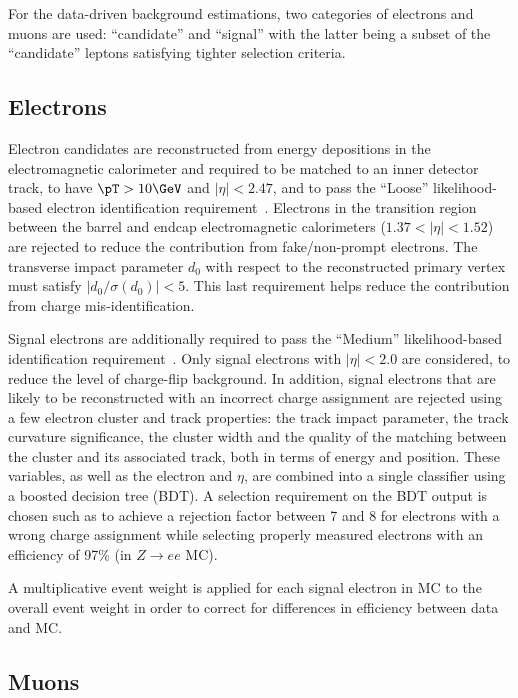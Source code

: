 For the data-driven background estimations, two categories of electrons and muons are used: 
``candidate'' and ``signal'' with the latter being a subset of the ``candidate'' leptons satisfying tighter selection criteria. 

\subsection*{Electrons}
\label{subsec:sec.strategy.sel.objects_electrons}

Electron candidates are reconstructed from energy depositions in the 
electromagnetic calorimeter and required to be matched to an 
inner detector track, 
to have $\pT> 10 \GeV$ and $|\eta|<2.47$, and to pass the 
``Loose'' likelihood-based electron identification 
requirement~\cite{ATLAS-CONF-2016-024}.
Electrons in the transition region between the barrel and endcap 
electromagnetic calorimeters ($1.37<|\eta|<1.52$) are rejected to reduce 
the contribution from fake/non-prompt electrons. 
The transverse impact parameter $d_0$ 
with respect to the reconstructed primary vertex 
must satisfy $|d_0/\sigma(d_0)|<5$.
This last requirement helps reduce the contribution from charge 
mis-identification. 

Signal electrons are additionally required to pass the ``Medium'' 
likelihood-based identification requirement~\cite{ATLAS-CONF-2016-024}.
Only signal electrons with $|\eta|<2.0$ are considered, 
to reduce the level of charge-flip background.
In addition, signal electrons that are likely to be reconstructed with an incorrect charge assignment are rejected using a few electron cluster and track properties: the track impact parameter, the track curvature significance, the cluster width and the quality of the matching between the cluster and its associated track, both in terms of energy and position. These variables, as well as the electron \pt and $\eta$, are combined into a single classifier using a boosted decision tree (BDT). A selection requirement on the BDT output is chosen such as to achieve a rejection factor between 7 and 8 for electrons with a wrong charge assignment while selecting properly measured electrons with an efficiency of 97\% (in $Z\rightarrow ee$ MC). 

A multiplicative event weight is applied for each signal electron in MC to the overall event weight 
in order to correct for differences in efficiency between data and MC.

\subsection*{Muons}
\label{subsec:sec.strategy.sel.objects_muons}

